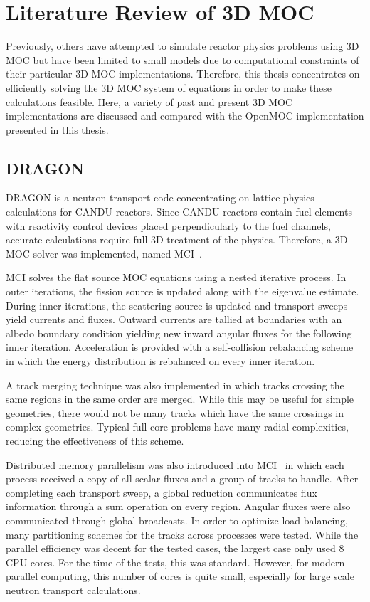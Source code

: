 \section{Literature Review of 3D MOC}
\label{sec:lit-review}

Previously, others have attempted to simulate reactor physics problems using 3D \ac{MOC} but have been limited to small models due to computational constraints of their particular 3D \ac{MOC} implementations. Therefore, this thesis concentrates on efficiently solving the 3D \ac{MOC} system of equations in order to make these calculations feasible. Here, a variety of past and present 3D \ac{MOC} implementations are discussed and compared with the OpenMOC implementation presented in this thesis.

\subsection{DRAGON}
\label{sec:dragon}
DRAGON is a neutron transport code concentrating on lattice physics calculations for CANDU reactors. Since CANDU reactors contain fuel elements with reactivity control devices placed perpendicularly to the fuel channels, accurate calculations require full 3D treatment of the physics. Therefore, a 3D \ac{MOC} solver was implemented, named MCI~\cite{dragon_3d_moc}. 

MCI solves the flat source \ac{MOC} equations using a nested iterative process. In outer iterations, the fission source is updated along with the eigenvalue estimate. During inner iterations, the scattering source is updated and transport sweeps yield currents and fluxes. Outward currents are tallied at boundaries with an albedo boundary condition yielding new inward angular fluxes for the following inner iteration. Acceleration is provided with a self-collision rebalancing scheme in which the energy distribution is rebalanced on every inner iteration.

A track merging technique was also implemented in which tracks crossing the same regions in the same order are merged. While this may be useful for simple geometries, there would not be many tracks which have the same crossings in complex geometries. Typical full core problems have many radial complexities, reducing the effectiveness of this scheme.

Distributed memory parallelism was also introduced into MCI~\cite{dragon_parallel} in which each process received a copy of all scalar fluxes and a group of tracks to handle. After completing each transport sweep, a global reduction communicates flux information through a sum operation on every region. Angular fluxes were also communicated through global broadcasts. In order to optimize load balancing, many partitioning schemes for the tracks across processes were tested. While the parallel efficiency was decent for the tested cases, the largest case only used 8 CPU cores. For the time of the tests, this was standard. However, for modern parallel computing, this number of cores is quite small, especially for large scale neutron transport calculations.


